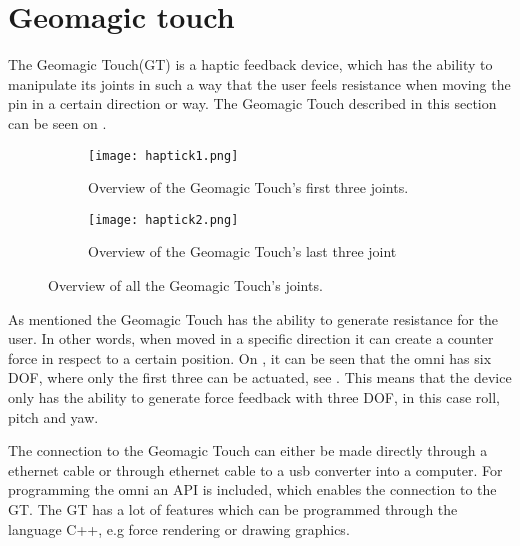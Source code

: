 \section{Geomagic touch}\label{sec:geo_magic}
The Geomagic Touch(GT) is a haptic feedback device, which has the ability to manipulate its joints in such a way that the user feels resistance when moving the pin in a certain direction or way. The Geomagic Touch described in this section can be seen on .

\begin{figure}[H]
	\centering
	\begin{subfigure}{.45\textwidth}
		\centering
		\texttt{[image: haptick1.png]}
		\caption{Overview of the Geomagic Touch's first three joints.}
		\label{fig:phantom1}
	\end{subfigure}
	\begin{subfigure}{.45\textwidth}
		\centering
		\texttt{[image: haptick2.png]}
		\caption{Overview of the Geomagic Touch's last three joint}
		\label{fig:phantom2}
	\end{subfigure}
\caption{Overview of all the Geomagic Touch's joints.}
\label{fig:phantom_omni}
\end{figure}

As mentioned the Geomagic Touch has the ability to generate resistance for the user. In other words, when moved in a specific direction it can create a counter force in respect to a certain position. On , it can be seen that the omni has six \gls{DOF}, where only the first three can be actuated, see . This means that the device only has the ability to generate force feedback with three \gls{DOF}, in this case roll, pitch and yaw.

The connection to the Geomagic Touch can either be made directly through a ethernet cable or through ethernet cable to a usb converter into a computer. For programming the omni an API is included, which enables the connection to the GT. The GT has a lot of features which can be programmed through the language C++, e.g force rendering or drawing graphics.

